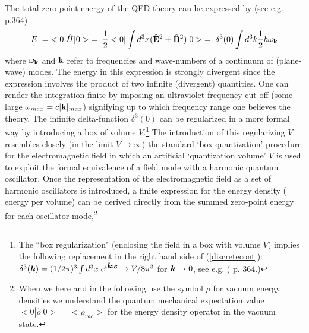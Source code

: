 \documentclass[12pt]{article}
\newcommand{\BFACE}[1] {\mbox{\boldmath $#1$} }
\begin{document}
The total zero-point energy of the QED theory can be expressed by
(see e.g. \cite{milonni94} p.364)
\begin{equation} \label{discretecont}
E \;=  \; <0| \hat{H} | 0> \; =\; 
\frac{1}{2}<0|\int d^3 x({\hat{\bf E}}^2 + {\hat{\bf
B}}^2)|0> \;
= \; \delta^{3} (0) \int d^3 k \frac{1}{2} \hbar \omega_{\bf k}
\end{equation}
where $\omega_{\bf k}$ and ${\bf k}$ refer to frequencies and
wave-numbers of a continuum of (plane-wave) modes. The energy in
this expression is strongly divergent since the expression
involves the product of two infinite (divergent) quantities. One
can render the integration finite by imposing an ultraviolet
frequency cut-off (some large $\omega_{max}=c|{\bf{k}}|_{max}$)
signifying up to which frequency range one believes the theory.
The infinite delta-function $\delta^3 (0)$ can be regularized in a
more formal way by introducing a box of volume $V$.\footnote{The
``box regularization" (enclosing the field in a box with volume
$V$) implies the following replacement in the right hand side of
(\ref{discretecont}): $ \delta^3 (\BFACE{k}) = (1/2\pi)^3 \int d^3
x \; e^{i \BFACE{k} \BFACE{x}} \rightarrow V/8 \pi^3 $ for
$\BFACE{k} \rightarrow 0$, see e.g. (\cite{milonni94} p. 364.)}
The introduction of this regularizing $V$ resembles closely (in
the limit $V \rightarrow \infty$) the standard `box-quantization'
procedure for the electromagnetic field in which an artificial
`quantization volume' $V$ is used to exploit the formal
equivalence of a field mode with a harmonic quantum oscillator.
Once the representation of the electromagnetic field as a set of
harmonic oscillators is introduced, a finite expression for the
energy density (= energy per volume) can be derived directly from
the summed zero-point energy for each oscillator
mode,\footnote{When we here and in the following use the symbol
$\rho$ for vacuum energy densities we understand the quantum
mechanical expectation value $<0|\hat{\rho}|0>=<\rho_{vac}>$ for
the energy density operator in the vacuum state.}
\end{document}
